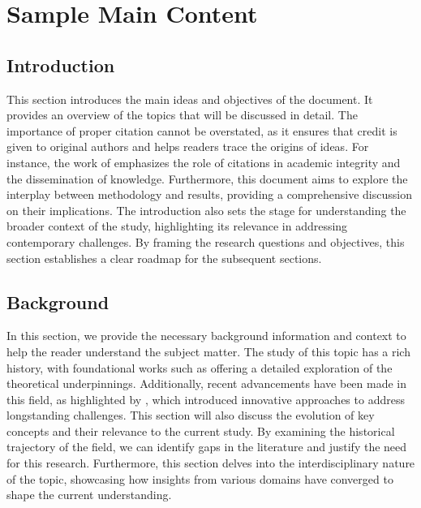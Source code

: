 \chapter{Sample Main Content}
    \section{Introduction}
    This section introduces the main ideas and objectives of the document. It provides an overview of the topics that will be discussed in detail. The importance of proper citation cannot be overstated, as it ensures that credit is given to original authors and helps readers trace the origins of ideas. For instance, the work of \cite{sample2023} emphasizes the role of citations in academic integrity and the dissemination of knowledge. Furthermore, this document aims to explore the interplay between methodology and results, providing a comprehensive discussion on their implications. The introduction also sets the stage for understanding the broader context of the study, highlighting its relevance in addressing contemporary challenges. By framing the research questions and objectives, this section establishes a clear roadmap for the subsequent sections.

    \section{Background}
    In this section, we provide the necessary background information and context to help the reader understand the subject matter. The study of this topic has a rich history, with foundational works such as \cite{samplebook2023} offering a detailed exploration of the theoretical underpinnings. Additionally, recent advancements have been made in this field, as highlighted by \cite{sampleconference2023}, which introduced innovative approaches to address longstanding challenges. This section will also discuss the evolution of key concepts and their relevance to the current study. By examining the historical trajectory of the field, we can identify gaps in the literature and justify the need for this research. Furthermore, this section delves into the interdisciplinary nature of the topic, showcasing how insights from various domains have converged to shape the current understanding.

